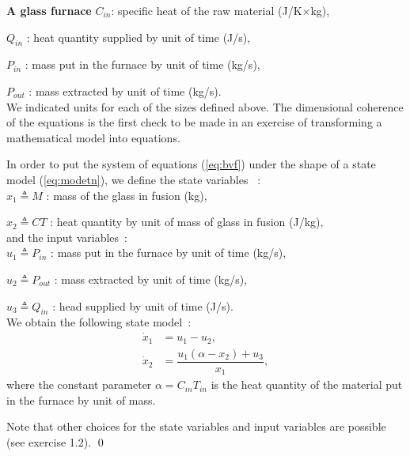 \begin{exemple}{\bf A glass furnace}
$C_{in}$: specific heat of the raw material (J/K$\times$kg),

$Q_{in}$ : heat quantity supplied by unit of time (J/s),

$P_{in}$ : mass put in the furnace by unit of time (kg/s),

$P_{out}$ : mass extracted by unit of time (kg/s).\\

\noindent We indicated units for each of the sizes defined above. The dimensional coherence of the equations is the first check to be made in an exercise of transforming a mathematical model into equations.

In order to put the system of equations (\ref {eq:bvf}) under the shape of a state model (\ref {eq:modetn}), we define the state variables ~: \\

$x_1 \triangleq M$ : mass of the glass in fusion (kg),

$x_2 \triangleq C T$ : heat quantity by unit of mass of glass in fusion (J/kg),\\

\noindent and the input variables~:\\

$u_1 \triangleq P_{in}$ : mass put in the furnace by unit of time (kg/s),

$u_2 \triangleq P_{out}$ : mass extracted by unit of time (kg/s),

$u_3 \triangleq Q_{in}$ : head supplied by unit of time (J/s).\\

\noindent We obtain the following state model~:
\begin{equation} \begin{split} \label{four1}
\dot x_1 &= u_1 - u_2, \\
\dot x_2 &= \dfrac {u_1(\alpha - x_2) + u_3}{x_1},
\end{split} \end{equation}
where the constant parameter $\alpha = C_{in}T_{in}$ is the heat quantity of the material put in the furnace by unit of mass.

Note that other choices for the state variables and input variables are possible (see exercise 1.2). \qed
\end{exemple}  
\vv

